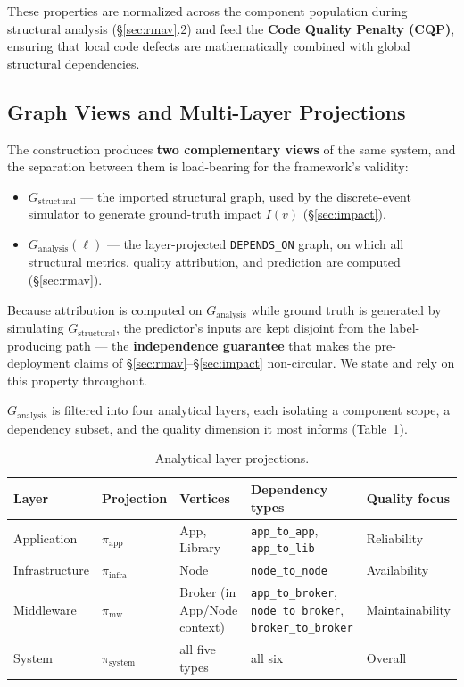 \documentclass[review]{elsarticle}
\begin{document}
These properties are normalized across the component population during structural analysis
(\S\ref{sec:rmav}.2) and feed the \textbf{Code Quality Penalty (CQP)}, ensuring that local code
defects are mathematically combined with global structural dependencies.

\subsection{Graph Views and Multi-Layer Projections}

The construction produces \textbf{two complementary views} of the same system, and the separation
between them is load-bearing for the framework's validity:

\begin{itemize}
\item $G_{\text{structural}}$ --- the imported structural graph, used by the discrete-event
  simulator to generate ground-truth impact $I(v)$ (\S\ref{sec:impact}).
\item $G_{\text{analysis}}(\ell)$ --- the layer-projected \texttt{DEPENDS\_ON} graph, on which all
  structural metrics, quality attribution, and prediction are computed (\S\ref{sec:rmav}).
\end{itemize}

Because attribution is computed on $G_{\text{analysis}}$ while ground truth is generated by
simulating $G_{\text{structural}}$, the predictor's inputs are kept disjoint from the
label-producing path --- the \textbf{independence guarantee} that makes the pre-deployment claims of
\S\ref{sec:rmav}--\S\ref{sec:impact} non-circular. We state and rely on this property throughout.

$G_{\text{analysis}}$ is filtered into four analytical layers, each isolating a component scope, a
dependency subset, and the quality dimension it most informs (Table~\ref{tab:layers}).

\begin{table}[h]
\centering
\caption{Analytical layer projections.}
\label{tab:layers}
\begin{tabular}{@{}p{2.3cm}p{1.6cm}p{2.6cm}p{4cm}p{2cm}@{}}
\toprule
Layer & Projection & Vertices & Dependency types & Quality focus \\
\midrule
Application & $\pi_{\text{app}}$ & App, Library & \texttt{app\_to\_app}, \texttt{app\_to\_lib} & Reliability \\
Infrastructure & $\pi_{\text{infra}}$ & Node & \texttt{node\_to\_node} & Availability \\
Middleware & $\pi_{\text{mw}}$ & Broker (in App/Node context) & \texttt{app\_to\_broker}, \texttt{node\_to\_broker}, \texttt{broker\_to\_broker} & Maintainability \\
System & $\pi_{\text{system}}$ & all five types & all six & Overall \\
\bottomrule
\end{tabular}
\end{table}
\end{document}
